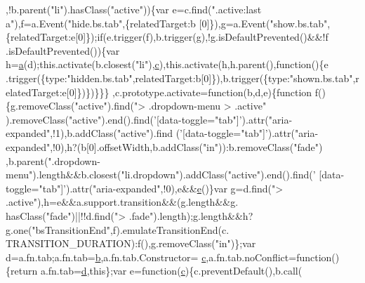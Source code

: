 \begin{DoxyCode}
{      ,!b.parent(\textcolor{stringliteral}{"li"}).hasClass(\textcolor{stringliteral}{"active"}))\{var e=c.find(\textcolor{stringliteral}{".active:last a"}),f=a.Event(\textcolor{stringliteral}{"hide.bs.tab"},\{relatedTarget:b
      [0]\}),g=a.Event(\textcolor{stringliteral}{"show.bs.tab"},\{relatedTarget:e[0]\});\textcolor{keywordflow}{if}(e.trigger(f),b.trigger(g),!g.isDefaultPrevented()&&!f
      .isDefaultPrevented())\{var h=\hyperlink{bootstrap_8min_8js_ae8f6b400ed3390908c5cdeebed3a82b9}{a}(d);this.activate(b.closest(\textcolor{stringliteral}{"li"}),\hyperlink{bootstrap_8min_8js_ad9d1ac02e33c4aed62ad517a7cb8b3fb}{c}),this.activate(h,h.parent(),\textcolor{keyword}{function}()\{e
      .trigger(\{type:\textcolor{stringliteral}{"hidden.bs.tab"},relatedTarget:b[0]\}),b.trigger(\{type:\textcolor{stringliteral}{"shown.bs.tab"},relatedTarget:e[0]\})\})\}\}\}
      ,c.prototype.activate=\textcolor{keyword}{function}(b,d,e)\{\textcolor{keyword}{function} f()\{g.removeClass(\textcolor{stringliteral}{"active"}).find(\textcolor{stringliteral}{"> .dropdown-menu > .active"}
      ).removeClass(\textcolor{stringliteral}{"active"}).end().find(\textcolor{stringliteral}{'[data-toggle="tab"]'}).attr(\textcolor{stringliteral}{"aria-expanded"},!1),b.addClass(\textcolor{stringliteral}{"active"}).find
      (\textcolor{stringliteral}{'[data-toggle="tab"]'}).attr(\textcolor{stringliteral}{"aria-expanded"},!0),h?(b[0].offsetWidth,b.addClass(\textcolor{stringliteral}{"in"})):b.removeClass(\textcolor{stringliteral}{"fade"})
      ,b.parent(\textcolor{stringliteral}{".dropdown-menu"}).length&&b.closest(\textcolor{stringliteral}{"li.dropdown"}).addClass(\textcolor{stringliteral}{"active"}).end().find(\textcolor{stringliteral}{'
      [data-toggle="tab"]'}).attr(\textcolor{stringliteral}{"aria-expanded"},!0),e&&\hyperlink{bootstrap_8min_8js_ab5902775854a8b8440bcd25e0fe1c120}{e}()\}var g=d.find(\textcolor{stringliteral}{"> .active"}),h=e&&a.support.transition&&(g.length&&g.
      hasClass(\textcolor{stringliteral}{"fade"})||!!d.find(\textcolor{stringliteral}{"> .fade"}).length);g.length&&h?g.one(\textcolor{stringliteral}{"bsTransitionEnd"},f).emulateTransitionEnd(c.
      TRANSITION\_DURATION):f(),g.removeClass(\textcolor{stringliteral}{"in"})\};var d=a.fn.tab;a.fn.tab=\hyperlink{bootstrap_8min_8js_ac0431efac4d7c393d1e70b86115cb93f}{b},a.fn.tab.Constructor=
      \hyperlink{bootstrap_8min_8js_ad9d1ac02e33c4aed62ad517a7cb8b3fb}{c},a.fn.tab.noConflict=\textcolor{keyword}{function}()\{\textcolor{keywordflow}{return} a.fn.tab=\hyperlink{bootstrap_8min_8js_aeb337d295abaddb5ec3cb34cc2e2bbc9}{d},\textcolor{keyword}{this}\};var e=\textcolor{keyword}{function}(\hyperlink{bootstrap_8min_8js_ad9d1ac02e33c4aed62ad517a7cb8b3fb}{c})\{c.preventDefault(),b.call(
}
\end{DoxyCode}
